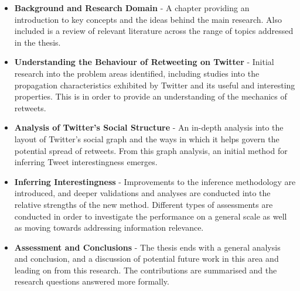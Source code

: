 \begin{itemize}
    \item \textbf{Background and Research Domain} - A chapter providing an introduction to key concepts and the ideas behind the main research. Also included is a review of relevant literature across the range of topics addressed in the thesis.
    \item \textbf{Understanding the Behaviour of Retweeting on Twitter} - Initial research into the problem areas identified, including studies into the propagation characteristics exhibited by Twitter and its useful and interesting properties. This is in order to provide an understanding of the mechanics of retweets.
    \item \textbf{Analysis of Twitter's Social Structure} - An in-depth analysis into the layout of Twitter's social graph and the ways in which it helps govern the potential spread of retweets. From this graph analysis, an initial method for inferring Tweet interestingness emerges.
    \item \textbf{Inferring Interestingness} - Improvements to the inference methodology are introduced, and deeper validations and analyses are conducted into the relative strengths of the new method. Different types of assessments are conducted in order to investigate the performance on a general scale as well as moving towards addressing information relevance.
    \item \textbf{Assessment and Conclusions} - The thesis ends with a general analysis and conclusion, and a discussion of potential future work in this area and leading on from this research. The contributions are summarised and the research questions answered more formally.
\end{itemize}
